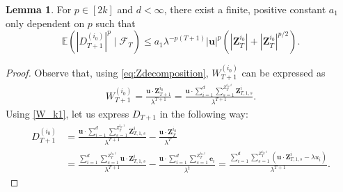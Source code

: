 \documentclass[preprint,3p,12pt]{elsarticle}
\theoremstyle{definition}
\newtheorem{lemma}{Lemma}
\begin{document}
\begin{lemma}\label{lemma:E_D}
For $p \in [2k]$ and $d < \infty$, there exist a finite, positive constant $a_1$ only dependent on $p$ such that
    \begin{equation} \label{eq:only_D}
         \mathbb{E}(|D_{T+1}^{(i_0)}|^p\mid \mathcal{F}_T) \le a_1  \lambda^{-p(T+1)} |\boldsymbol{u}|^p\left(|\boldsymbol{Z}_T^{i_0}|  + |\boldsymbol{Z}_T^{i_0}|^{p/2}\right).
    \end{equation}
\end{lemma}
\begin{proof}
Observe that, using \eqref{eq:Zdecomposition}, $W_{T+1}^{(i_0)}$ can be expressed as %
\begin{align}
    W_{T+1}^{(i_0)} = \frac{\boldsymbol{u} \cdot \boldsymbol{Z}_{T+1}^{i_0}}{\lambda^{T+1}} = \frac{\boldsymbol{u} \cdot \sum_{i=1}^d \sum_{s=1}^{Z_T^{i_0, i}} \boldsymbol{Z}_{T,1,s}^{i}}{\lambda^{T+1}} \label{W_k1}.
\end{align}
Using \eqref{W_k1}, let us express $D_{T+1}$ in the following way:
\begin{align*}
    D_{T+1}^{(i_0)} &= \frac{\boldsymbol{u} \cdot \sum_{i=1}^d \sum_{s=1}^{Z_T^{i_0, i}} \boldsymbol{Z}_{T,1,s}^{i}}{\lambda^{T+1}} - \frac{\boldsymbol{u} \cdot \boldsymbol{Z}_T^{i_0}}{\lambda^T}\\
    &= \frac{\sum_{i=1}^d \sum_{s=1}^{Z_T^{i_0, i}} \boldsymbol{u} \cdot \boldsymbol{Z}_{T,1,s}^{i}}{\lambda^{T+1}} - \frac{\boldsymbol{u}  \cdot \sum_{i=1}^d \sum_{s=1}^{Z_T^{i_0, i}}\boldsymbol{e}_{i}}{\lambda^t} 
    = \frac{\sum_{i=1}^d \sum_{s=1}^{Z_T^{i_0, i}} (\boldsymbol{u} \cdot \boldsymbol{Z}_{T,1,s}^{i} - \lambda u_{i})}{\lambda^{T+1}}. 
\end{align*}


\end{proof}
\end{document}
